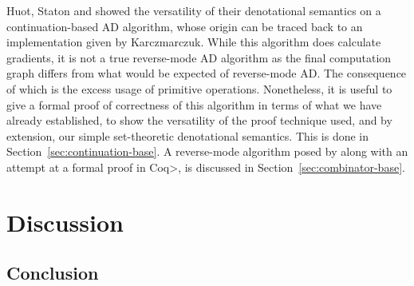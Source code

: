 \documentclass[11pt, final]{article}
\begin{document}
  Huot, Staton and \Vakar{} showed the versatility of their denotational semantics on a continuation-based AD algorithm, whose origin can be traced back to an implementation given by Karczmarczuk\cite{Karczmarczuk98functionaldifferentiation}.
  While this algorithm does calculate gradients, it is not a true reverse-mode AD algorithm as the final computation graph differs from what would be expected of reverse-mode AD\cite{PearlmutterSiskind2008}.
  The consequence of which is the excess usage of primitive operations.
  Nonetheless, it is useful to give a formal proof of correctness of this algorithm in terms of what we have already established, to show the versatility of the proof technique used, and by extension, our simple set-theoretic denotational semantics.
  This is done in Section~\ref{sec:continuation-base}.
  A reverse-mode algorithm posed by \Vakar{}\cite{} along with an attempt at a formal proof in \<Coq>, is discussed in Section~\ref{sec:combinator-base}.
  
  
\section{Discussion}
  
  \subsection{Conclusion}
\appendix
\printbibliography
\makeatother
\end{document}
